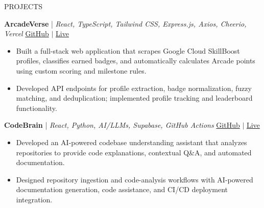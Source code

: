 \documentclass{resume} %
\begin{document}

\begin{rSection}{PROJECTS}


\textbf{ArcadeVerse} | {\small\textit{React, TypeScript, Tailwind CSS, Express.js, Axios, Cheerio, Vercel}} \hfill
\href{https://github.com/AnniiGCP/arcadeverse-dev}{GitHub} $|$
\href{https://arcadeverse.vercel.app/}{Live} \\

\vspace{-1.2em}

\begin{itemize}
\itemsep -3pt

\item Built a full-stack web application that scrapes Google Cloud SkillBoost profiles, classifies earned badges, and automatically calculates Arcade points using custom scoring and milestone rules.

\item Developed API endpoints for profile extraction, badge normalization, fuzzy matching, and deduplication; implemented profile tracking and leaderboard functionality.

\end{itemize}

\vspace{-0.1em}


\textbf{CodeBrain } | {\small\textit{React, Python, AI/LLMs, Supabase, GitHub Actions}} \hfill
\href{https://github.com/AnniiGCP/CodeBrain}{GitHub} $|$
\href{https://codebrain-dev.vercel.app/}{Live} \\

\vspace{-1.2em}
\begin{itemize}
\itemsep -3pt

\item Developed an AI-powered codebase understanding assistant that analyzes repositories to provide code explanations, contextual Q\&A, and automated documentation.

\item Designed repository ingestion and code-analysis workflows with AI-powered documentation generation, code assistance, and CI/CD deployment integration.


\end{itemize}
\end{rSection}
\end{document}
